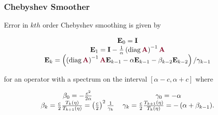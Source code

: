 \documentclass{beamer}
\DeclareMathOperator{\diag}{diag}
\begin{document}

\begin{frame}
\begin{center}
\frametitle{Chebyshev Smoother}

Error in $kth$ order Chebyshev smoothing is given by

\begin{equation}
\begin{tabular}{c}
$\mathbf{E}_0 = \mathbf{I}$\\
$\mathbf{E}_1 = \mathbf{I} - \frac{1}{\alpha} \left( \diag {\color{burgundy}\mathbf{A}} \right)^{-1} {\color{burgundy}\mathbf{A}}$\\
$\mathbf{E}_k = \left( \left( \diag {\color{burgundy}\mathbf{A}} \right)^{-1} {\color{burgundy}\mathbf{A}} \mathbf{E}_{k - 1} - \alpha \mathbf{E}_{k - 1} - \beta_{k - 2} \mathbf{E}_{k - 2} \right) / \gamma_{k - 1}$
\end{tabular}
\label{eq:chebyshev_error_propagation}
\end{equation}

for an operator with a spectrum on the interval $\left[ \alpha - c, \alpha + c \right]$ where

\begin{equation}
\begin{tabular}{c c}
$\beta_0 = - \frac{c^2}{2 \alpha}$ & $\gamma_0 = - \alpha$\\
$\beta_k = \frac{c}{2} \frac{T_k \left( \eta \right)}{T_{k + 1} \left( \eta \right)} = \left( \frac{c}{2} \right)^2 \frac{1}{\gamma_k}$ & $\gamma_k = \frac{c}{2} \frac{T_{k + 1} \left( \eta \right)}{T_k \left( \eta \right)} = - \left( \alpha + \beta_{k - 1} \right)$.
\end{tabular}
\end{equation}

\end{center}
\end{frame}

\end{document}
